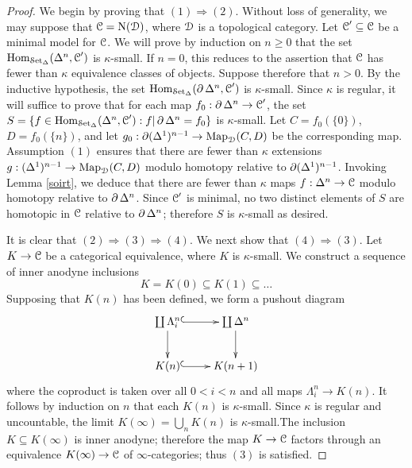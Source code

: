 \begin{proof}
We begin by proving that $(1) \Rightarrow (2)$. Without loss of generality, we may suppose that
$\operatorname{\mathcal{C}} = \operatorname{N}(\operatorname{\mathcal{D}})$, where $\operatorname{\mathcal{D}}$ is a topological category. Let $\operatorname{\mathcal{C}}' \subseteq \operatorname{\mathcal{C}}$ be a minimal model for $\operatorname{\mathcal{C}}$. We will prove by induction on $n \geq 0$ that the set
$\operatorname{Hom}_{\operatorname{\mathcal{S}et_{\Delta}}}(\Delta^n, \operatorname{\mathcal{C}}')$ is $\kappa$-small. If $n=0$, this reduces to the assertion that
$\operatorname{\mathcal{C}}$ has fewer than $\kappa$ equivalence classes of objects. Suppose therefore that $n > 0$. By the inductive hypothesis, the set $\operatorname{Hom}_{\operatorname{\mathcal{S}et_{\Delta}}}(\operatorname{\partial} \Delta^n, \operatorname{\mathcal{C}}')$ is $\kappa$-small.
Since $\kappa$ is regular, it will suffice to prove that for each map $f_0: \operatorname{\partial} \Delta^n \rightarrow \operatorname{\mathcal{C}}'$, the set $S = \{ f \in \operatorname{Hom}_{\operatorname{\mathcal{S}et_{\Delta}}}(\Delta^n, \operatorname{\mathcal{C}}'): f|\operatorname{\partial} \Delta^n = f_0 \}$ is $\kappa$-small.
Let $C = f_0(\{0\})$, $D = f_0( \{n\})$, and let $g_0: \operatorname{\partial} (\Delta^1)^{n-1} \rightarrow \operatorname{{Map}}_{\operatorname{\mathcal{D}}}(C,D)$
be the corresponding map. Assumption $(1)$ ensures that there are fewer than $\kappa$
extensions $g: (\Delta^1)^{n-1} \rightarrow \operatorname{{Map}}_{\operatorname{\mathcal{D}}}(C,D)$ modulo homotopy relative to $\operatorname{\partial} (\Delta^1)^{n-1}$. Invoking Lemma \ref{soirt}, we deduce that there are fewer than $\kappa$ maps
$f: \Delta^n \rightarrow \operatorname{\mathcal{C}}$ modulo homotopy relative to $\operatorname{\partial} \Delta^n$. Since $\operatorname{\mathcal{C}}'$ is minimal, no two distinct elements of $S$ are homotopic in $\operatorname{\mathcal{C}}$ relative to $\operatorname{\partial} \Delta^n$; therefore $S$ is $\kappa$-small as desired.

It is clear that $(2) \Rightarrow (3) \Rightarrow (4)$. 
We next show that $(4) \Rightarrow (3)$. Let $K \rightarrow \operatorname{\mathcal{C}}$ be a categorical equivalence, where $K$ is $\kappa$-small.
We construct a sequence of inner anodyne inclusions
$$ K = K(0) \subseteq K(1) \subseteq \ldots $$
Supposing that $K(n)$ has been defined, we form a pushout diagram
$$ \xymatrix{ \coprod \Lambda^n_i \ar@{^{(}->}[r] \ar[d] & \coprod \Delta^n \ar[d] \\
K(n) \ar@{^{(}->}[r] & K(n+1) }$$
where the coproduct is taken over all $0 < i < n$ and all maps $\Lambda^n_i \rightarrow K(n)$.
It follows by induction on $n$ that each $K(n)$ is $\kappa$-small. Since $\kappa$ is regular and uncountable, the limit $K(\infty) = \bigcup_{n} K(n)$ is $\kappa$-small.The inclusion
$K \subseteq K(\infty)$ is inner anodyne; therefore the map $K \rightarrow \operatorname{\mathcal{C}}$ factors through an equivalence $K(\infty) \rightarrow \operatorname{\mathcal{C}}$ of $\infty$-categories; thus $(3)$ is satisfied. 


\end{proof}
